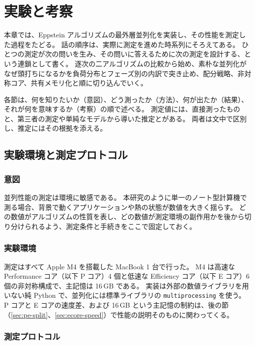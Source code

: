 \chapter{実験と考察}
\label{ch:experiments}

本章では、Eppstein アルゴリズムの最外層並列化を実装し、その性能を測定した過程をたどる。
話の順序は、実際に測定を進めた時系列にそろえてある。
ひとつの測定が次の問いを生み、その問いに答えるために次の測定を設計する、という連鎖として書く。
逐次の二アルゴリズムの比較から始め、素朴な並列化がなぜ頭打ちになるかを負荷分布とフェーズ別の内訳で突き止め、配分戦略、非対称コア、共有メモリ化と順に切り込んでいく。

各節は、何を知りたいか（意図）、どう測ったか（方法）、何が出たか（結果）、それが何を意味するか（考察）の順で述べる。
測定値には、直接測ったものと、第三者の測定や単純なモデルから導いた推定とがある。
両者は文中で区別し、推定にはその根拠を添える。

\section{実験環境と測定プロトコル}
\label{sec:exp-env}

\subsection{意図}

並列性能の測定は環境に敏感である。
本研究のように単一のノート型計算機で測る場合、背景で動くアプリケーションや熱の状態が数値を大きく揺らす。
どの数値がアルゴリズムの性質を表し、どの数値が測定環境の副作用かを後から切り分けられるよう、測定条件と手続きをここで固定しておく。

\subsection{実験環境}

測定はすべて Apple M4 を搭載した MacBook 1 台で行った。
M4 は高速な Performance コア（以下 P コア）4 個と低速な Efficiency コア（以下 E コア）6 個の非対称構成で、主記憶は 16\,GB である。
実装は外部の数値ライブラリを用いない純 Python で、並列化には標準ライブラリの \texttt{multiprocessing} を使う。
P コアと E コアの速度差、および 16\,GB という主記憶の制約は、後の節（\ref{sec:pe-split}、\ref{sec:ecore-speed}）で性能の説明そのものに関わってくる。

\subsection{測定プロトコル}

